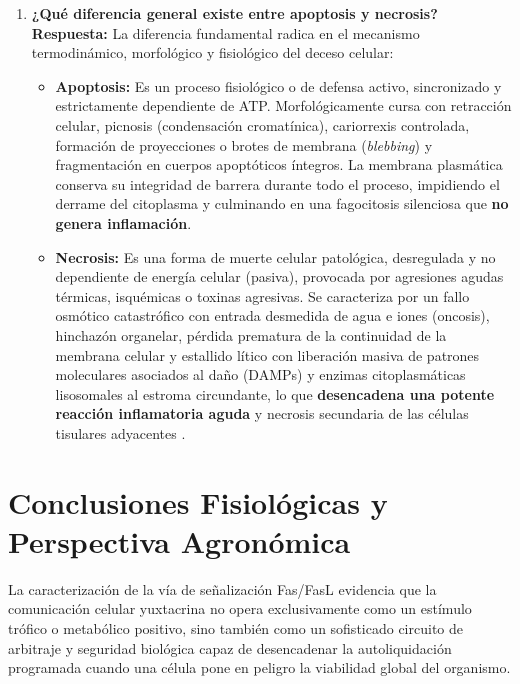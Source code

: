 \documentclass[spanish,letterpaper,oneside]{article}
\begin{document}
\begin{enumerate}[label=\textbf{\arabic*.}]
	\item \textbf{¿Qué diferencia general existe entre apoptosis y necrosis?}\\
	\textbf{Respuesta:} La diferencia fundamental radica en el mecanismo termodinámico, morfológico y fisiológico del deceso celular:
	\begin{itemize}[leftmargin=1.5em,itemsep=0.15em]
		\item \textbf{Apoptosis:} Es un proceso fisiológico o de defensa activo, sincronizado y estrictamente dependiente de ATP. Morfológicamente cursa con retracción celular, picnosis (condensación cromatínica), cariorrexis controlada, formación de proyecciones o brotes de membrana (\emph{blebbing}) y fragmentación en cuerpos apoptóticos íntegros. La membrana plasmática conserva su integridad de barrera durante todo el proceso, impidiendo el derrame del citoplasma y culminando en una fagocitosis silenciosa que \textbf{no genera inflamación}.
		\item \textbf{Necrosis:} Es una forma de muerte celular patológica, desregulada y no dependiente de energía celular (pasiva), provocada por agresiones agudas térmicas, isquémicas o toxinas agresivas. Se caracteriza por un fallo osmótico catastrófico con entrada desmedida de agua e iones (oncosis), hinchazón organelar, pérdida prematura de la continuidad de la membrana celular y estallido lítico con liberación masiva de patrones moleculares asociados al daño (DAMPs) y enzimas citoplasmáticas lisosomales al estroma circundante, lo que \textbf{desencadena una potente reacción inflamatoria aguda} y necrosis secundaria de las células tisulares adyacentes \parencite{alberts2022molecular,guegan2022fas}.
	\end{itemize}
\end{enumerate}

\clearpage
\section{Conclusiones Fisiológicas y Perspectiva Agronómica}
La caracterización de la vía de señalización Fas/FasL evidencia que la comunicación celular yuxtacrina no opera exclusivamente como un estímulo trófico o metabólico positivo, sino también como un sofisticado circuito de arbitraje y seguridad biológica capaz de desencadenar la autoliquidación programada cuando una célula pone en peligro la viabilidad global del organismo.
\end{document}

